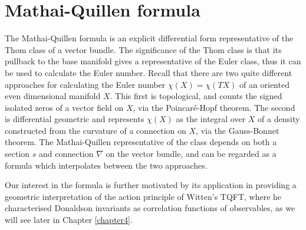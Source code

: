
\chapter{Mathai-Quillen formula}
\label{chapter3}
The Mathai-Quillen formula is an explicit differential form representative of 
the Thom class of a vector bundle. The significance of the Thom class is 
that its pullback to the base manifold gives a representative of the Euler
class, thus it can be used to calculate the Euler number.  
Recall that there are two quite different approaches for calculating the Euler number
$\chi(X) = \chi(TX)$ of an oriented even dimensional manifold $X$. 
This first is topological, and counts
the signed isolated zeros of a vector field on $X$, via the Poincar\'e-Hopf theorem. The
second is differential geometric and represents  $\chi(X)$ as the integral over
$X$ of a density constructed from the curvature of a connection on $X$, via
the Gauss-Bonnet theorem. 
The Mathai-Quillen representative of the class depends on both a section $s$ and 
connection  $\nabla$ on the vector bundle, and can be regarded as a formula 
which interpolates between the two approaches.  

Our interest in the formula is further motivated by its application in providing a
geometric interpretation of the action principle of Witten's TQFT, where he
characterised Donaldson invariants as correlation functions of observables, as
we will see later in Chapter \ref{chapter4}. 


